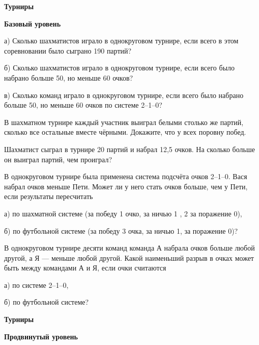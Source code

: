 \hspace{3mm}

\centerline{\bf \Huge Турниры}

\centerline{\bf \large Базовый уровень}

\begin{flushright}
        \scriptsize{}
\end{flushright}

а) Сколько шахматистов играло в однокруговом турнире, если всего в этом соревновании было сыграно 190 партий?

\noindent
б) Сколько шахматистов играло в однокруговом турнире, если всего было набрано больше 50, но меньше 60 очков?

\noindent
в) Сколько команд играло в однокруговом турнире, если всего было набрано больше 50, но меньше 60 очков по системе 2–1–0?

В шахматном турнире каждый участник выиграл белыми столько же партий, сколько все остальные вместе чёрными. Докажите, что у всех поровну побед.

Шахматист сыграл в турнире 20 партий и набрал 12,5 очков. На сколько больше он выиграл партий, чем проиграл?

В однокруговом турнире была применена система подсчёта очков 2–1–0. Вася набрал очков меньше Пети. Может ли у него стать очков больше, чем у Пети, если результаты пересчитать

а) по шахматной системе (за победу 1 очко, за ничью 1 , 2 за поражение 0),

б) по футбольной системе (за победу 3 очка, за ничью 1,
за поражение 0)?

В однокруговом турнире десяти команд команда А набрала очков больше любой другой, а Я — меньше любой другой. Какой наименьший разрыв в очках может быть между командами А и Я, если очки считаются

а) по системе 2–1–0,

б) по футбольной системе?



\newpage

\hspace{3mm}

\centerline{\bf \Huge Турниры}

\centerline{\bf \large Продвинутый уровень}

\begin{flushright}
        \scriptsize{}
\end{flushright}







